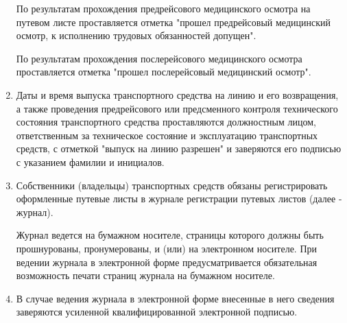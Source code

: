 \documentclass[../nirs.tex]{subfiles}
\begin{document}
\begin{enumerate}
		По результатам прохождения предрейсового медицинского осмотра на путевом
		листе проставляется отметка "прошел предрейсовый медицинский осмотр, к
		исполнению трудовых обязанностей допущен".

		По результатам прохождения послерейсового медицинского осмотра
		проставляется отметка "прошел послерейсовый медицинский осмотр".
	\item Даты и время выпуска транспортного средства на линию и его
		возвращения, а также проведения предрейсового или предсменного контроля
		технического состояния транспортного средства проставляются должностным
		лицом, ответственным за техническое состояние и эксплуатацию
		транспортных средств, с отметкой "выпуск на линию разрешен" и заверяются
		его подписью с указанием фамилии и инициалов.
	\item Собственники (владельцы) транспортных средств обязаны регистрировать
		оформленные путевые листы в журнале регистрации путевых листов (далее -
		журнал).

		Журнал ведется на бумажном носителе, страницы которого должны быть
		прошнурованы, пронумерованы, и (или) на электронном носителе. При
		ведении журнала в электронной форме предусматривается обязательная
		возможность печати страниц журнала на бумажном носителе.
	\item В случае ведения журнала в электронной форме внесенные в него сведения
		заверяются усиленной квалифицированной электронной подписью.
\end{enumerate}
\end{document}
